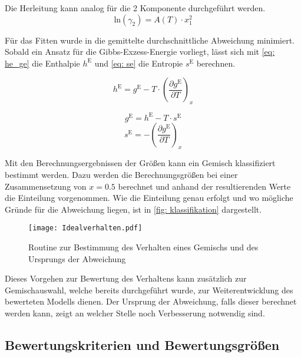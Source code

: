 \documentclass[../thesis.tex]{subfiles}
\begin{document}
Die Herleitung kann analog für die 2 Komponente durchgeführt werden.
\begin{equation}
	\mathrm{ln}(\gamma_2) = A(T) \cdot x_1^2
\end{equation}

Für das Fitten wurde in \cite{jaubert2020benchmark} die gemittelte durchschnittliche Abweichung minimiert. Sobald ein Ansatz für die Gibbs-Exzess-Energie vorliegt, lässt sich mit \autoref{eq: he_ge} die Enthalpie $h^{\mathrm{E}}$ und \autoref{eq: se} die Entropie $s^{\mathrm{E}}$ berechnen.

\begin{equation}
	\label{eq: he_ge}
	h^{\mathrm{E}} = g^{\mathrm{E}} - T \cdot \left( \dfrac{\partial g^{\mathrm{E}}}{\partial T} \right)_x
\end{equation}

\begin{equation}
	\label{eq: se_ansatz}
	g^{\mathrm{E}} = h^{\mathrm{E}} - T \cdot s^{\mathrm{E}}
\end{equation}
\begin{equation}
	\label{eq: se}
	s^{\mathrm{E}} = - \left( \dfrac{\partial g^{\mathrm{E}}}{\partial T} \right)_x
\end{equation}

Mit den Berechnungsergebnissen der Größen kann ein Gemisch klassifiziert bestimmt werden. Dazu werden die Berechnungsgrößen bei einer Zusammensetzung von $x=\text{0.5}$ berechnet und anhand der resultierenden Werte die Einteilung vorgenommen. Wie die Einteilung genau erfolgt und wo mögliche Gründe für die Abweichung liegen, ist in \autoref{fig: klassifikation} dargestellt.

\begin{figure}[htbp]
	\centering
	\texttt{[image: Idealverhalten.pdf]}
	\caption{Routine zur Bestimmung des Verhalten eines Gemischs und des Ursprungs der Abweichung}
	\label{fig: klassifikation}
\end{figure}

Dieses Vorgehen zur Bewertung des Verhaltens kann zusätzlich zur Gemischauswahl, welche bereits durchgeführt wurde, zur Weiterentwicklung des bewerteten Modells dienen. Der Ursprung der Abweichung, falls dieser berechnet werden kann, zeigt an welcher Stelle noch Verbesserung notwendig sind.  

\subsection{Bewertungskriterien und Bewertungsgrößen}
\end{document}
